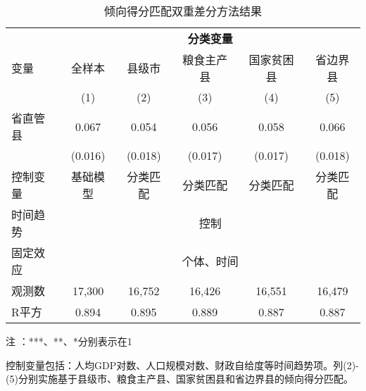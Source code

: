 \begin{table}[!htbp]
\footnotesize
\centering
\caption{倾向得分匹配双重差分方法结果}\label{tab:psmdid}
\begin{threeparttable}
\begin{tabular}{lccccc}
\toprule
 & \multicolumn{5}{c}{\textbf{分类变量}} \\
\cmidrule(lr){2-6}
变量 & 全样本 & 县级市 & 粮食主产县 & 国家贫困县 & 省边界县 \\
 & (1) & (2) & (3) & (4) & (5) \\
\midrule
省直管县 & 0.067\tnote{***} & 0.054\tnote{**} & 0.056\tnote{**} & 0.058\tnote{***} & 0.066\tnote{***} \\
 & (0.016) & (0.018) & (0.017) & (0.017) & (0.018) \\
\midrule
控制变量 & 基础模型 & 分类匹配 & 分类匹配 & 分类匹配 & 分类匹配 \\
时间趋势 & \multicolumn{5}{c}{控制} \\
固定效应 & \multicolumn{5}{c}{个体、时间} \\
\cmidrule(lr){1-1}
观测数 & 17,300 & 16,752 & 16,426 & 16,551 & 16,479 \\
R平方 & 0.894 & 0.895 & 0.889 & 0.887 & 0.887 \\
\bottomrule
\end{tabular}

\begin{tablenotes}
\scriptsize
\item[注]：***、**、*分别表示在1%
\item 控制变量包括：人均GDP对数、人口规模对数、财政自给度等时间趋势项。列(2)-(5)分别实施基于县级市、粮食主产县、国家贫困县和省边界县的倾向得分匹配。
\end{tablenotes}
\end{threeparttable}
\end{table}
